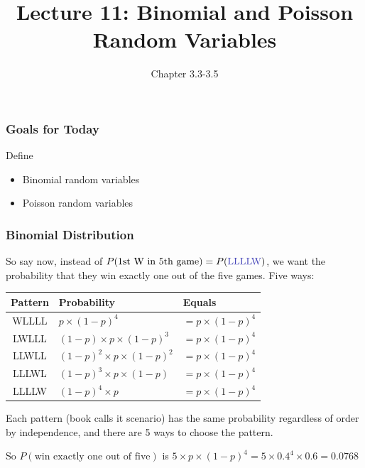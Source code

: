 \documentclass[handout]{beamer}
\title{Lecture 11: Binomial and Poisson Random Variables}
\author{Chapter 3.3-3.5}
\date{}
\newcommand{\blue}[1]{\textcolor{blue2}{#1}}
\begin{document}
\begin{frame}
\titlepage
\end{frame}



\begin{frame}[fragile]
\frametitle{Goals for Today}

Define
\begin{itemize}
\item Binomial random variables
\item Poisson random variables
\end{itemize}


\end{frame}


\begin{frame}
\frametitle{Binomial Distribution}

So say now, instead of $P(\mbox{1st W in 5th game}) = P(\mbox{\blue{LLLLW}})$, we want the probability that they win \blue{exactly one} out of the five games.  Five ways:

\pause\begin{center}
\begin{tabular}{c|ll}
Pattern & Probability & Equals\\
\hline
\blue{WLLLL} & $p \times (1-p)^4$ & $=p\times(1-p)^4$\\
\blue{LWLLL} & $(1-p) \times p \times (1-p)^3$ & $=p\times(1-p)^4$\\
\blue{LLWLL} & $(1-p)^2 \times p \times (1-p)^2$& $=p\times(1-p)^4$\\
\blue{LLLWL} & $(1-p)^3 \times p \times (1-p)$& $=p\times(1-p)^4$\\
\blue{LLLLW} & $(1-p)^4 \times p$& $=p\times(1-p)^4$\\
\end{tabular} 
\end{center}

\pause Each pattern (book calls it scenario) has the same probability regardless of order by independence, and there are 5 ways to \blue{choose} the pattern.

\vspace{0.25cm}

\pause So $P(\mbox{win exactly one out of five})$ is  $5 \times p\times(1-p)^4 = 5 \times 0.4^4 \times 0.6 = 0.0768$

\end{frame}
\end{document}
